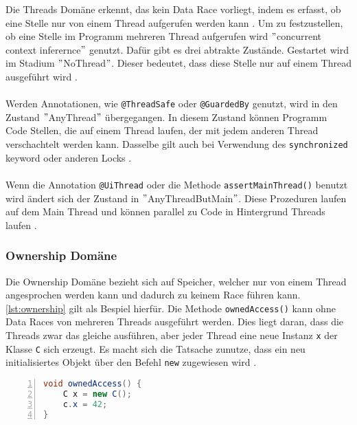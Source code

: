 Die Threads Domäne erkennt, das kein Data Race vorliegt, indem es erfasst, ob eine Stelle nur von einem Thread aufgerufen werden kann \cite[vgl.][8]{racerd}. Um zu festzustellen, ob eine Stelle im Programm mehreren Thread aufgerufen wird $"$concurrent context inferernce$"$ \cite[9]{racerd} genutzt. Dafür gibt es drei abtrakte Zustände.
Gestartet wird im Stadium $"$NoThread$"$. Dieser bedeutet, dass diese Stelle nur auf einem Thread ausgeführt wird \cite[vgl.][9-10]{racerd}.\\
\\
Werden Annotationen, wie \texttt{@ThreadSafe} oder \texttt{@GuardedBy} genutzt, wird in den Zustand $"$AnyThread$"$ übergegangen. In diesem Zustand können Programm Code Stellen, die auf einem Thread laufen, der mit jedem anderen Thread verschachtelt werden kann. Dasselbe gilt auch bei Verwendung des \texttt{synchronized} keyword oder anderen Locks \cite[vgl.][10]{racerd}.\\
\\
Wenn die Annotation \texttt{@UiThread} oder die Methode \texttt{assertMainThread()} benutzt wird ändert sich der Zustand in $"$AnyThreadButMain$"$. Diese Prozeduren laufen auf dem Main Thread und können parallel zu Code in Hintergrund Threads laufen \cite[vgl.][10]{racerd}.

\subsubsection*{Ownership Domäne}

Die Ownership Domäne bezieht sich auf Speicher, welcher nur von einem Thread angesprochen werden kann und dadurch zu keinem Race führen kann. \ref{lst:ownership} gilt als Bespiel hierfür. Die Methode \texttt{ownedAccess()} kann ohne Data Races von mehreren Threads ausgeführt werden. Dies liegt daran, dass die Threads zwar das gleiche ausführen, aber jeder Thread eine neue Instanz \texttt{x} der Klasse \texttt{C} sich erzeugt. Es macht sich die Tatsache zunutze, dass ein neu initialisiertes Objekt über den Befehl \texttt{new} zugewiesen wird \cite[vgl.][10]{racerd}. \\

\begin{lstlisting}[language=Java,frame=tb,caption={Ownership Domäne \cite{racerd}}, label={lst:ownership}, numbers=left, stepnumber=1, captionpos=b, tabsize=4]
void ownedAccess() {
	C x = new C();
	c.x = 42;
}
\end{lstlisting}

